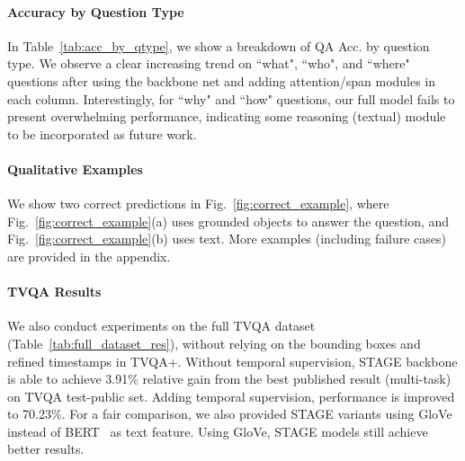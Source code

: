 \documentclass[11pt,a4paper]{article}
\begin{document}
\paragraph{Accuracy by Question Type} 
In Table~\ref{tab:acc_by_qtype}, we show a breakdown of QA Acc. by question type. 
We observe a clear increasing trend on ``what", ``who", and ``where" questions after using the backbone net and adding attention/span modules in each column.  
Interestingly, for ``why" and ``how" questions, our full model fails to present overwhelming performance, indicating some reasoning (textual) module to be incorporated as future work.

\paragraph{Qualitative Examples} 
We show two correct predictions in Fig.~\ref{fig:correct_example}, where Fig.~\ref{fig:correct_example}(a) uses grounded objects to answer the question, and Fig.~\ref{fig:correct_example}(b) uses text. More examples (including failure cases) are provided in the appendix.


\begin{table}[!t]
\centering
\small
{}
\caption{QA Acc. on the full TVQA dataset.}
\label{tab:full_dataset_res}
\end{table}




\paragraph{TVQA Results} 
We also conduct experiments on the full TVQA dataset (Table~\ref{tab:full_dataset_res}), without relying on the bounding boxes and refined timestamps in TVQA+.
Without temporal supervision, STAGE backbone is able to achieve 3.91\% relative gain from the best published result (multi-task) on TVQA test-public set. 
Adding temporal supervision, performance is improved to 70.23\%. For a fair comparison, we also provided STAGE variants using GloVe~\cite{pennington2014glove} instead of BERT~\cite{Devlin2018BERTPO} as text feature. Using GloVe, STAGE models still achieve better results.
\end{document}
